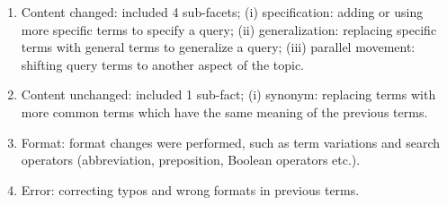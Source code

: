 \documentclass[]{article}
\begin{document}
\begin{enumerate}
	\item Content changed: included 4 sub-facets; (i) specification: adding or using more specific terms to specify a query; (ii) generalization: replacing specific terms with general terms to generalize a query; (iii) parallel movement: shifting query terms to another aspect of the topic.
	\item Content unchanged: included 1 sub-fact; (i) synonym: replacing terms with more common terms which have the same meaning of the previous terms.
	\item  Format: format changes were performed, such as term variations and search operators (abbreviation, preposition, Boolean operators etc.).
	\item  Error: correcting typos and wrong formats in previous terms. 
\end{enumerate}
    
\end{document}
